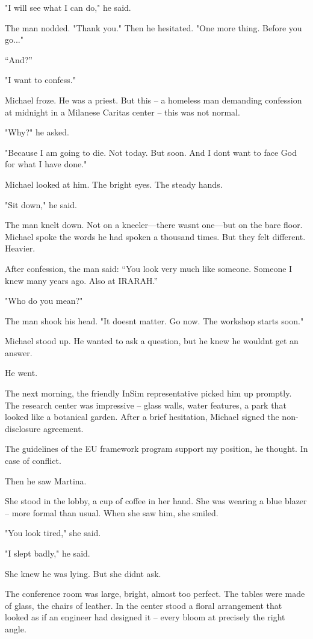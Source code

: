 \documentclass[
]{article}
\begin{document}
"I will see what I can do," he said.

The man nodded. "Thank you." Then he hesitated. "One more thing. Before you go..."

``And?''

"I want to confess."

Michael froze. He was a priest. But this -- a homeless man demanding confession at midnight in a Milanese Caritas center -- this was not normal.

"Why?" he asked.

"Because I am going to die. Not today. But soon. And I don\textquotesingle t want to face God for what I have done."

Michael looked at him. The bright eyes. The steady hands.

"Sit down," he said.

The man knelt down. Not on a kneeler---there wasn\textquotesingle t one---but on the bare floor. Michael spoke the words he had spoken a thousand times. But they felt different. Heavier.

After confession, the man said: ``You look very much like someone. Someone I knew many years ago. Also at IRARAH.''

"Who do you mean?"

The man shook his head. "It doesn\textquotesingle t matter. Go now. The workshop starts soon."

Michael stood up. He wanted to ask a question, but he knew he wouldn\textquotesingle t get an answer.

He went.

The next morning, the friendly InSim representative picked him up promptly. The research center was impressive -- glass walls, water features, a park that looked like a botanical garden. After a brief hesitation, Michael signed the non-disclosure agreement.

The guidelines of the EU framework program support my position, he thought. In case of conflict.

Then he saw Martina.

She stood in the lobby, a cup of coffee in her hand. She was wearing a blue blazer -- more formal than usual. When she saw him, she smiled.

"You look tired," she said.

"I slept badly," he said.

She knew he was lying. But she didn\textquotesingle t ask.

The conference room was large, bright, almost too perfect. The tables were made of glass, the chairs of leather. In the center stood a floral arrangement that looked as if an engineer had designed it -- every bloom at precisely the right angle.
\end{document}
